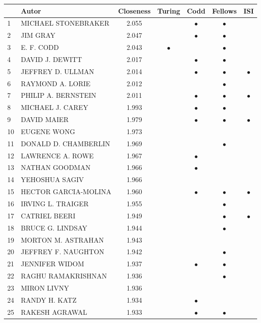 \documentclass[12pt,titlepage]{report}
\begin{document}
\begin{center}
\begin{tabular}{|l|l|c|c|c|c|c|}
\hline
& {\bf Autor} & {\bf Closeness} & {\bf Turing} & {\bf Codd} & {\bf Fellows} & {\bf ISI} \\
\hline
1  & MICHAEL STONEBRAKER & 2.055& & $\bullet$ & $\bullet$ &           \\
\hline
2  & JIM GRAY & 2.047&           & $\bullet$ & $\bullet$ &           \\
\hline
3  & E. F. CODD & 2.043& $\bullet$ &           & $\bullet$ &           \\
\hline
4  & DAVID J. DEWITT & 2.017&           & $\bullet$ & $\bullet$ &           \\
\hline
5  & JEFFREY D. ULLMAN & 2.014&           & $\bullet$ & $\bullet$ & $\bullet$ \\
\hline
6  & RAYMOND A. LORIE & 2.012&           &           & $\bullet$ &           \\
\hline
7  & PHILIP A. BERNSTEIN & 2.011&& $\bullet$ & $\bullet$ & $\bullet$ \\
\hline
8  & MICHAEL J. CAREY & 1.993&&$\bullet$&$\bullet$&         \\
\hline
9  & DAVID MAIER & 1.979&         &$\bullet$&$\bullet$&$\bullet$\\
\hline
10 & EUGENE WONG & 1.973& &  &   & \\
\hline
11 & DONALD D. CHAMBERLIN & 1.969& & & $\bullet$ &           \\
\hline
12 & LAWRENCE A. ROWE & 1.967 &&$\bullet$&&\\
\hline
13 & NATHAN GOODMAN & 1.966 & & $\bullet$ &         &         \\
\hline
14 & YEHOSHUA SAGIV & 1.966&         &         &         &         \\
\hline
15 & HECTOR GARCIA-MOLINA & 1.960 &&$\bullet$&$\bullet$&$\bullet$\\
\hline
16 & IRVING L. TRAIGER & 1.955&           &           & $\bullet$ &           \\
\hline
17 & CATRIEL BEERI & 1.949&         &         &$\bullet$&$\bullet$\\
\hline
18 & BRUCE G. LINDSAY & 1.944&         &         &$\bullet$&         \\
\hline
19 & MORTON M. ASTRAHAN & 1.943&     &     &     &           \\
\hline
20 & JEFFREY F. NAUGHTON & 1.942&&         &$\bullet$&         \\
\hline
21 & JENNIFER WIDOM & 1.937&         &$\bullet$&$\bullet$&         \\
\hline
22 & RAGHU RAMAKRISHNAN & 1.936 &&         &$\bullet$&         \\
\hline
23 & MIRON LIVNY & 1.936&&         &         &         \\
\hline
24 & RANDY H. KATZ & 1.934 &&$\bullet$&&\\
\hline
25 & RAKESH AGRAWAL & 1.933&&$\bullet$&$\bullet$&         \\
\hline
\end{tabular}
\end{center}
\end{document}
